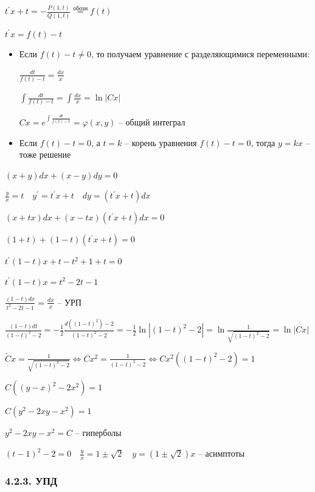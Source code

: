 \documentclass[12pt]{article}
\begin{document}
    $t^\prime x + t = -\frac{P(1, t)}{Q(1, t)} \stackrel{\text{обозн}}{=} f(t)$

    $t^\prime x = f(t) - t$

    \begin{itemize}
        \item Если $f(t) - t \neq 0$, то получаем уравнение с разделяющимися переменными:

        $\frac{dt}{f(t) - t} = \frac{dx}{x}$

        $\int\frac{dt}{f(t) - t} = \int\frac{dx}{x} = \ln|Cx|$

        $Cx = e^{\int\frac{dt}{f(t) - t}} = \varphi(x, y)$ -- общий интеграл

        \item Если $f(t) - t = 0$, а $t = k$ -- корень уравнения $f(t) - t = 0$, тогда $y = kx$ -- тоже решение
    \end{itemize}

    \Ex $(x + y)dx + (x - y)dy = 0$

    $\frac{y}{x} = t \quad y^\prime = t^\prime x + t \quad dy = (t^\prime x + t)dx$

    $(x + tx)dx + (x - tx)(t^\prime x + t)dx = 0$

    $(1 + t) + (1 - t)(t^\prime x + t) = 0$

    $t^\prime (1 - t) x + t - t^2 + 1 + t = 0$

    $t^\prime (1 - t) x = t^2 - 2t - 1$

    $\frac{(1 - t) dx}{t^2 - 2t - 1} = \frac{dx}{x}$ -- УРП

    $\frac{(1 - t)dt}{(1 - t)^2 - 2} = -\frac{1}{2}\frac{d((1 - t)^2) - 2}{(1 - t)^2 - 2} = -\frac{1}{2}\ln|(1 - t)^2 - 2| = \ln\frac{1}{\sqrt{(1 - t)^2 - 2}} = \ln|Cx|$

    $\tilde{C}x = \frac{1}{\sqrt{(1 - t)^2 - 2}} \Longleftrightarrow Cx^2 = \frac{1}{(1 - t)^2 - 2} \Longleftrightarrow Cx^2 ((1 - t)^2 - 2) = 1$

    $C ((y - x)^2 - 2x^2) = 1$

    $C (y^2 - 2xy - x^2) = 1$

    $y^2 - 2xy - x^2 = C$ -- гиперболы

    $(t - 1)^2 - 2 = 0 \quad \frac{y}{x} = 1 \pm \sqrt{2} \quad y = (1 \pm \sqrt{2})x$ -- асимптоты

    \hypertarget{equationincompletedifferentials}{}

    \subsubsection{4.2.3. УПД}
\end{document}
